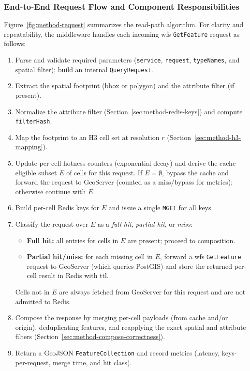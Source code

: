 \subsubsection{End-to-End Request Flow and Component Responsibilities}

Figure~\ref{fig:method-request} summarizes the read-path algorithm. For clarity and repeatability, the middleware handles each incoming \ac{wfs} \texttt{GetFeature} request as follows:
\begin{enumerate}
  \item Parse and validate required parameters (\texttt{service}, \texttt{request}, \texttt{typeNames}, and spatial filter); build an internal \texttt{QueryRequest}.
  \item Extract the spatial footprint (\ac{bbox} or polygon) and the attribute filter (if present).
  \item Normalize the attribute filter (Section~\ref{sec:method-redis-keys}) and compute \texttt{filterHash}.
  \item Map the footprint to an H3 cell set at resolution $r$ (Section~\ref{sec:method-h3-mapping}).
  \item Update per-cell hotness counters (exponential decay) and derive the cache-eligible subset $E$ of cells for this request. If $E=\emptyset$, bypass the cache and forward the request to GeoServer (counted as a miss/bypass for metrics); otherwise continue with $E$.
  \item Build per-cell Redis keys for $E$ and issue a single \texttt{MGET} for all keys.
  \item Classify the request over $E$ as a \emph{full hit}, \emph{partial hit}, or \emph{miss}:
    \begin{itemize}
      \item \textbf{Full hit:} all entries for cells in $E$ are present; proceed to composition.
      \item \textbf{Partial hit/miss:} for each missing cell in $E$, forward a \ac{wfs} \texttt{GetFeature} request to GeoServer (which queries PostGIS) and store the returned per-cell result in Redis with \ac{ttl}.
    \end{itemize}
    Cells not in $E$ are always fetched from GeoServer for this request and are not admitted to Redis.
  \item Compose the response by merging per-cell payloads (from cache and/or origin), deduplicating features, and reapplying the exact spatial and attribute filters (Section~\ref{sec:method-compose-correctness}).
  \item Return a GeoJSON \texttt{FeatureCollection} and record metrics (latency, keys-per-request, merge time, and hit class).
\end{enumerate}

